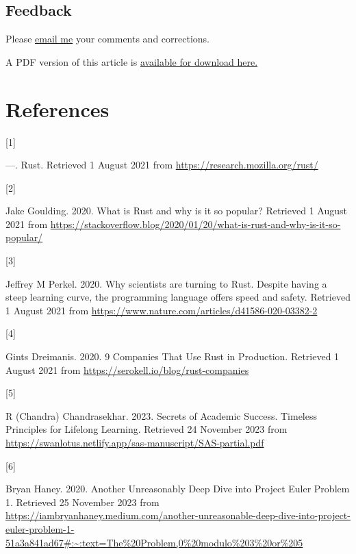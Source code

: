 \documentclass[
  a4paper,
]{article}
\newlength{\cslhangindent}
\newlength{\csllabelwidth}
\newlength{\cslentryspacingunit} %
\newenvironment{CSLReferences}[2] %
 {%
  \setlength{\parindent}{0pt}
  \ifodd #1
  \let\oldpar\par
  \def\par{\hangindent=\cslhangindent\oldpar}
  \fi
  \setlength{\parskip}{#2\cslentryspacingunit}
 }%
 {}
\newcommand{\CSLLeftMargin}[1]{\parbox[t]{\csllabelwidth}{#1}}
\newcommand{\CSLRightInline}[1]{\parbox[t]{\linewidth - \csllabelwidth}{#1}\break}
\begin{document}
\hypertarget{feedback}{%
\subsection{Feedback}\label{feedback}}

Please \href{mailto:feedback.swanlotus@gmail.com}{email me} your
comments and corrections.

\noindent A PDF version of this article is
\href{./rust-euler-one.pdf}{available for download here.}

\hypertarget{bibliography}{%
\section*{References}\label{bibliography}}

\hypertarget{refs}{}
\begin{CSLReferences}{0}{0}
\leavevmode{}%
\CSLLeftMargin{{[}1{]} }%
\CSLRightInline{---. {Rust}. Retrieved 1 August 2021 from
\url{https://research.mozilla.org/rust/}}

\leavevmode{}%
\CSLLeftMargin{{[}2{]} }%
\CSLRightInline{Jake Goulding. 2020. {What is Rust and why is it so
popular?} Retrieved 1 August 2021 from
\url{https://stackoverflow.blog/2020/01/20/what-is-rust-and-why-is-it-so-popular/}}

\leavevmode{}%
\CSLLeftMargin{{[}3{]} }%
\CSLRightInline{Jeffrey M Perkel. 2020. {Why scientists are turning to
Rust}. Despite having a steep learning curve, the programming language
offers speed and safety. Retrieved 1 August 2021 from
\url{https://www.nature.com/articles/d41586-020-03382-2}}

\leavevmode{}%
\CSLLeftMargin{{[}4{]} }%
\CSLRightInline{Gints Dreimanis. 2020. {9 Companies That Use Rust in
Production}. Retrieved 1 August 2021 from
\url{https://serokell.io/blog/rust-companies}}

\leavevmode{}%
\CSLLeftMargin{{[}5{]} }%
\CSLRightInline{R (Chandra) Chandrasekhar. 2023. {Secrets of Academic
Success}. {Timeless Principles for Lifelong Learning}. Retrieved 24
November 2023 from
\url{https://swanlotus.netlify.app/sas-manuscript/SAS-partial.pdf}}

\leavevmode{}%
\CSLLeftMargin{{[}6{]} }%
\CSLRightInline{Bryan Haney. 2020. {Another Unreasonably Deep Dive into
Project Euler Problem 1}. Retrieved 25 November 2023 from
\url{https://iambryanhaney.medium.com/another-unreasonable-deep-dive-into-project-euler-problem-1-51a3a841ad67\#:~:text=The\%20Problem,0\%20modulo\%203\%20or\%205}}

\end{CSLReferences}
\end{document}
